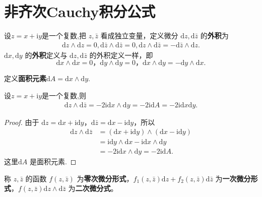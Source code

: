 \documentclass[../../main.tex]{subfiles}%
\begin{document}
\section{非齐次Cauchy积分公式}

\begin{definition}
设$z=x+\mathrm{i}y$是一个复数,把 \( z,\bar{z} \) 看成独立变量，定义微分 \( \mathrm{d}z,\mathrm{d}\bar{z} \) 的\textbf{外积}为
\begin{align*}
\mathrm{d}z \wedge \mathrm{d}z = 0, 
\mathrm{d}\bar{z} \wedge \mathrm{d}\bar{z} = 0, 
\mathrm{d}z \wedge \mathrm{d}\bar{z} = -\mathrm{d}\bar{z} \wedge \mathrm{d}z.
\end{align*}
\( \mathrm{d}x,\mathrm{d}y \) 的\textbf{外积}定义与 \( \mathrm{d}z,\mathrm{d}\bar{z} \) 的外积定义一样，即 
\[
\mathrm{d}x \wedge \mathrm{d}x = 0 ， \mathrm{d}y \wedge \mathrm{d}y = 0 ， \mathrm{d}x \wedge \mathrm{d}y = -\mathrm{d}y \wedge \mathrm{d}x .
\]

定义\textbf{面积元素}\( \mathrm{d}A =\mathrm{d}x \wedge \mathrm{d}y .\) 
\end{definition}

\begin{proposition}
设$z=x+\mathrm{i}y$是一个复数,则
\begin{align*}
\mathrm{d}z \wedge \mathrm{d}\bar{z} = -2\mathrm{i}\mathrm{d}x \wedge \mathrm{d}y = -2\mathrm{i}\mathrm{d}A=-2\mathrm{i}\mathrm{d}x\mathrm{d}y.
\end{align*}
\end{proposition}
\begin{proof}
由于 \( \mathrm{d}z = \mathrm{d}x + \mathrm{i}\mathrm{d}y \)，\( \mathrm{d}\bar{z} = \mathrm{d}x - \mathrm{i}\mathrm{d}y \)，所以
\begin{align*}
\mathrm{d}z \wedge \mathrm{d}\bar{z} &= (\mathrm{d}x + \mathrm{i}\mathrm{d}y) \wedge (\mathrm{d}x - \mathrm{i}\mathrm{d}y) \\
&= \mathrm{i}\mathrm{d}y \wedge \mathrm{d}x - \mathrm{i}\mathrm{d}x \wedge \mathrm{d}y \\
&= -2\mathrm{i}\mathrm{d}x \wedge \mathrm{d}y = -2\mathrm{i}\mathrm{d}A.
\end{align*}
这里\( \mathrm{d}A \) 是面积元素.
\end{proof}

\begin{definition}
称 \( z,\bar{z} \) 的函数 \( f(z,\bar{z}) \) 为\textbf{零次微分形式}，\( f_1(z,\bar{z})\mathrm{d}z + f_2(z,\bar{z})\mathrm{d}\bar{z} \) 为\textbf{一次微分形式}，\( f(z,\bar{z})\mathrm{d}z \wedge \mathrm{d}\bar{z} \) 为\textbf{二次微分式}。
\end{definition}
\end{document}
